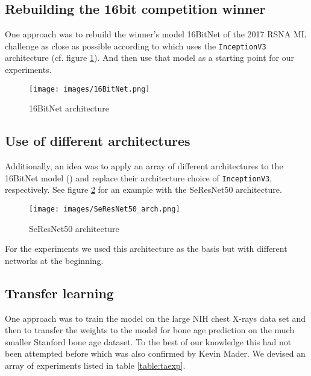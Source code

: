 \documentclass[10pt,twocolumn,letterpaper]{article}
\begin{document}
\subsection{Rebuilding the 16bit competition winner}
One approach was to rebuild the winner's model 16BitNet of the 2017 RSNA ML challenge as close as possible according to \cite{16bitrsnachallenge} which uses the \verb+InceptionV3+ architecture (cf. figure \ref{fig:16bitnet}). And then use that model as a starting point for our experiments. 

\begin{figure}[h]
\texttt{[image: images/16BitNet.png]}
\centering
\caption{16BitNet architecture}
\label{fig:16bitnet}
\end{figure}

\subsection{Use of different architectures}
Additionally, an idea was to apply an array of different architectures to the 16BitNet model (\cite{16bitrsnachallenge}) and replace their architecture choice of \verb+InceptionV3+, respectively. See figure \ref{fig:SeResNet50} for an example with the SeResNet50 architecture.

\begin{figure}[h]
\texttt{[image: images/SeResNet50\_arch.png]}
\centering
\caption{SeResNet50 architecture}
\label{fig:SeResNet50}
\end{figure}

For the experiments we used this architecture as the basis but with different networks at the beginning.

\subsection{Transfer learning}
One approach was to train the model on the large NIH chest X-rays data set and then to transfer the weights to the model for bone age prediction on the much smaller Stanford bone age dataset. 
To the best of our knowledge this had not been attempted before which was also confirmed by Kevin Mader. We devised an array of experiments listed in table \ref{table:taexp}.
\end{document}
